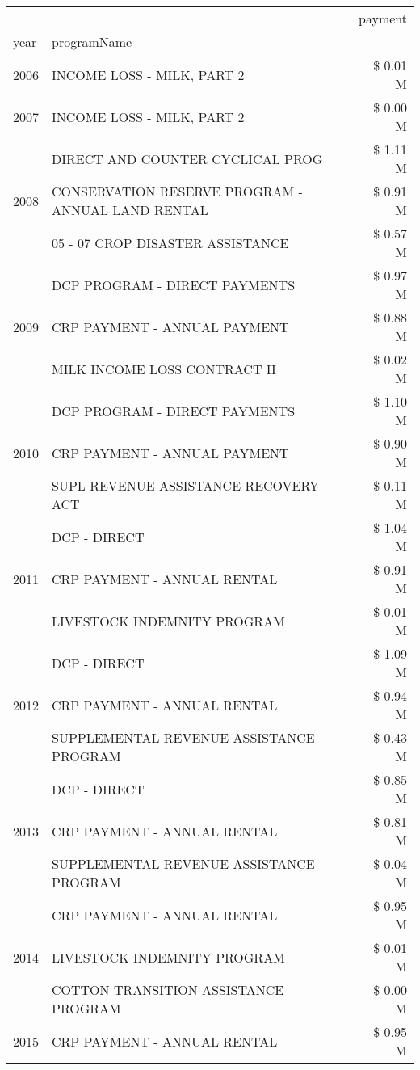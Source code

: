 \begin{tabular}{llr}
\toprule
 &  & payment \\
year & programName &  \\
\midrule
2006 & INCOME LOSS - MILK, PART 2 & \$ 0.01 M \\
\cline{1-3}
2007 & INCOME LOSS - MILK, PART 2 & \$ 0.00 M \\
\cline{1-3}
\multirow[t]{3}{*}{2008} & DIRECT AND COUNTER CYCLICAL PROG & \$ 1.11 M \\
 & CONSERVATION RESERVE PROGRAM - ANNUAL LAND RENTAL & \$ 0.91 M \\
 & 05 - 07 CROP DISASTER ASSISTANCE & \$ 0.57 M \\
\cline{1-3}
\multirow[t]{3}{*}{2009} & DCP PROGRAM - DIRECT PAYMENTS & \$ 0.97 M \\
 & CRP PAYMENT - ANNUAL PAYMENT & \$ 0.88 M \\
 & MILK INCOME LOSS CONTRACT II & \$ 0.02 M \\
\cline{1-3}
\multirow[t]{3}{*}{2010} & DCP PROGRAM - DIRECT PAYMENTS & \$ 1.10 M \\
 & CRP PAYMENT - ANNUAL PAYMENT & \$ 0.90 M \\
 & SUPL REVENUE ASSISTANCE RECOVERY ACT & \$ 0.11 M \\
\cline{1-3}
\multirow[t]{3}{*}{2011} & DCP - DIRECT & \$ 1.04 M \\
 & CRP PAYMENT - ANNUAL RENTAL & \$ 0.91 M \\
 & LIVESTOCK INDEMNITY PROGRAM & \$ 0.01 M \\
\cline{1-3}
\multirow[t]{3}{*}{2012} & DCP - DIRECT & \$ 1.09 M \\
 & CRP PAYMENT - ANNUAL RENTAL & \$ 0.94 M \\
 & SUPPLEMENTAL REVENUE ASSISTANCE PROGRAM & \$ 0.43 M \\
\cline{1-3}
\multirow[t]{3}{*}{2013} & DCP - DIRECT & \$ 0.85 M \\
 & CRP PAYMENT - ANNUAL RENTAL & \$ 0.81 M \\
 & SUPPLEMENTAL REVENUE ASSISTANCE PROGRAM & \$ 0.04 M \\
\cline{1-3}
\multirow[t]{3}{*}{2014} & CRP PAYMENT - ANNUAL RENTAL & \$ 0.95 M \\
 & LIVESTOCK INDEMNITY PROGRAM & \$ 0.01 M \\
 & COTTON TRANSITION ASSISTANCE PROGRAM & \$ 0.00 M \\
\cline{1-3}
\multirow[t]{2}{*}{2015} & CRP PAYMENT - ANNUAL RENTAL & \$ 0.95 M \\

\end{tabular}
